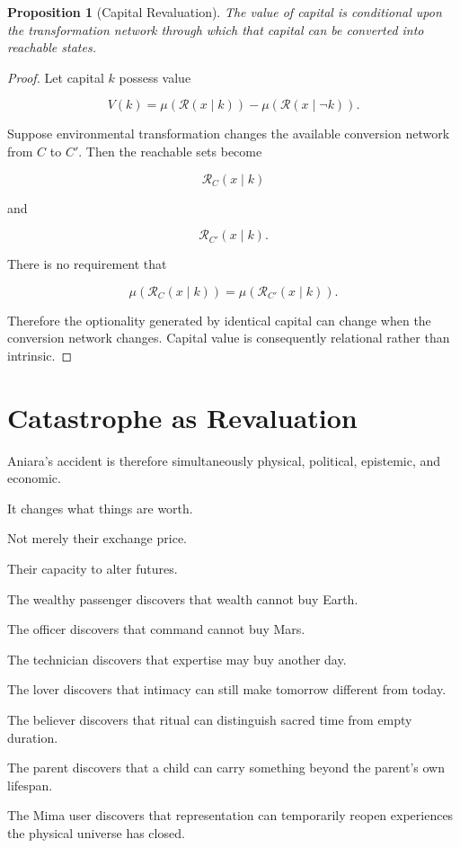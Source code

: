 \documentclass[11pt,oneside]{book}
\newtheorem{proposition}[theorem]{Proposition}
\theoremstyle{definition}
\theoremstyle{remark}
\newcommand{\R}{\mathcal{R}}
\begin{document}
\begin{proposition}[Capital Revaluation]
The value of capital is conditional upon the transformation network through which that capital can be converted into reachable states.
\end{proposition}

\begin{proof}
Let capital \(k\) possess value

\[
V(k)
=
\mu(\R(x\mid k))
-
\mu(\R(x\mid\neg k)).
\]

Suppose environmental transformation changes the available conversion network from \(C\) to \(C'\). Then the reachable sets become

\[
\R_C(x\mid k)
\]

and

\[
\R_{C'}(x\mid k).
\]

There is no requirement that

\[
\mu(\R_C(x\mid k))
=
\mu(\R_{C'}(x\mid k)).
\]

Therefore the optionality generated by identical capital can change when the conversion network changes. Capital value is consequently relational rather than intrinsic.
\end{proof}

\section{Catastrophe as Revaluation}

Aniara's accident is therefore simultaneously physical, political, epistemic, and economic.

It changes what things are worth.

Not merely their exchange price.

Their capacity to alter futures.

The wealthy passenger discovers that wealth cannot buy Earth.

The officer discovers that command cannot buy Mars.

The technician discovers that expertise may buy another day.

The lover discovers that intimacy can still make tomorrow different from today.

The believer discovers that ritual can distinguish sacred time from empty duration.

The parent discovers that a child can carry something beyond the parent's own lifespan.

The Mima user discovers that representation can temporarily reopen experiences the physical universe has closed.
\end{document}
